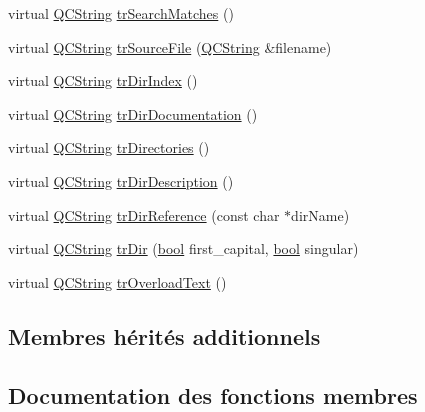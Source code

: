 \begin{DoxyCompactItemize}
virtual \hyperlink{class_q_c_string}{Q\+C\+String} \hyperlink{class_translator_lithuanian_afc1d35109226264fad29a911b77b5cf4}{tr\+Search\+Matches} ()
\item 
virtual \hyperlink{class_q_c_string}{Q\+C\+String} \hyperlink{class_translator_lithuanian_ae887ba8f5a4c523f18049445bce45d1f}{tr\+Source\+File} (\hyperlink{class_q_c_string}{Q\+C\+String} \&filename)
\item 
virtual \hyperlink{class_q_c_string}{Q\+C\+String} \hyperlink{class_translator_lithuanian_a669ef2fc09a32f4eaad9a85371d3b604}{tr\+Dir\+Index} ()
\item 
virtual \hyperlink{class_q_c_string}{Q\+C\+String} \hyperlink{class_translator_lithuanian_aae36eface98b68757c50a66408d1c016}{tr\+Dir\+Documentation} ()
\item 
virtual \hyperlink{class_q_c_string}{Q\+C\+String} \hyperlink{class_translator_lithuanian_affba1050665c411e2911b41246e0b370}{tr\+Directories} ()
\item 
virtual \hyperlink{class_q_c_string}{Q\+C\+String} \hyperlink{class_translator_lithuanian_a9dd9e8251d8ce6d17918057829ebbc70}{tr\+Dir\+Description} ()
\item 
virtual \hyperlink{class_q_c_string}{Q\+C\+String} \hyperlink{class_translator_lithuanian_a9b6cca1a05289a6d9a8b4d685af01767}{tr\+Dir\+Reference} (const char $\ast$dir\+Name)
\item 
virtual \hyperlink{class_q_c_string}{Q\+C\+String} \hyperlink{class_translator_lithuanian_a0d40d70a9821529c667a09e2e0962d97}{tr\+Dir} (\hyperlink{qglobal_8h_a1062901a7428fdd9c7f180f5e01ea056}{bool} first\+\_\+capital, \hyperlink{qglobal_8h_a1062901a7428fdd9c7f180f5e01ea056}{bool} singular)
\item 
virtual \hyperlink{class_q_c_string}{Q\+C\+String} \hyperlink{class_translator_lithuanian_a81169c147054a292dc0d5064a3e705f8}{tr\+Overload\+Text} ()
\end{DoxyCompactItemize}
\subsection*{Membres hérités additionnels}


\subsection{Documentation des fonctions membres}
\hypertarget{class_translator_lithuanian_a941f30a280e8e59f04e4218e862bd3aa}{}
